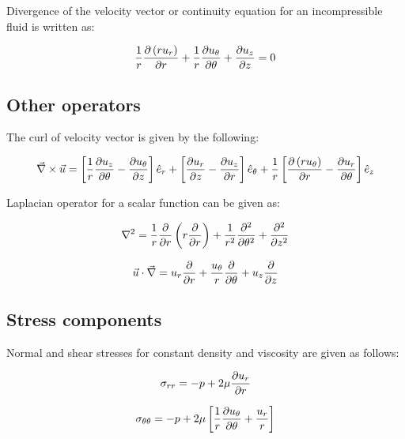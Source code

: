Divergence of the velocity vector or continuity equation for an incompressible fluid is written as:

\begin{equation}
{1 \over r}{\partial \left( r u_r\right) \over \partial r} + {1 \over r}{\partial u_\theta \over \partial \theta} + {\partial u_z \over \partial z} = 0
\end{equation}

\subsection{Other operators}

The curl of velocity vector is given by the following:

\begin{equation}
\vec{\nabla} \times \vec{u} = \left[ {1 \over r}{\partial u_z \over \partial \theta} - {\partial u_\theta \over \partial z} \right] \hat{e}_r + \left[ {\partial u_r \over \partial z} - {\partial u_z \over \partial r} \right] \hat{e}_\theta + {1 \over r} \left[ {\partial \left( r u_\theta\right) \over \partial r} - {\partial u_r \over \partial \theta} \right] \hat{e}_z
\end{equation}

Laplacian operator for a scalar function can be given as:

\begin{equation}
\nabla^2 = {1 \over r} {\partial \over \partial r} \left( r {\partial \over \partial r} \right) + {1 \over r^2} {\partial^2 \over \partial \theta^2} + {\partial^2 \over \partial z^2}
\end{equation}

\begin{equation}
\vec{u} \cdot \vec{\nabla} = u_r \frac{\partial}{\partial r} + \frac{u_\theta}{r} \frac{\partial}{\partial \theta} + u_z \frac{\partial}{\partial z}
\end{equation}


\subsection{Stress components}

Normal and shear stresses for constant density and viscosity are given as follows:

\begin{equation}
\sigma_{rr} = -p + 2 \mu {\partial u_r \over \partial r}
\end{equation}

\begin{equation}
\sigma_{\theta \theta} = -p + 2 \mu \left[ {1 \over r} {\partial u_\theta \over \partial \theta} + {u_r \over r} \right]
\end{equation}

